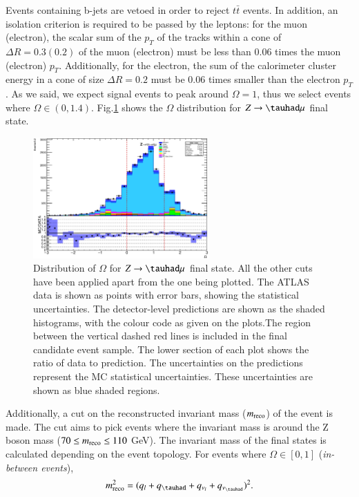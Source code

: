 Events containing b-jets are vetoed in order to reject $t\bar{t}$ events. In addition, an isolation criterion is required to be passed by the leptons: for the muon (electron), the scalar sum of the $p_T$ of the tracks within a cone of $\Delta R=0.3 (0.2)$ of the muon (electron) must be less than 0.06 times the muon (electron) $p_T$. Additionally, for the electron, the sum of the calorimeter cluster energy in a cone of size $\Delta R=0.2$ must be 0.06 times smaller than the electron $p_T$. As we said, we expect signal events to peak around $\Omega=1$, thus we select events where $\Omega\in (0,1.4)$. Fig.\ref{Fig3} shows the $\Omega$ distribution for $Z\to\tauhad\mu$ final state.
\begin{figure}[htbp]
	\centering
	\includegraphics[width=0.6\textwidth]{figures/Fig3.png}
	\caption{Distribution of $\Omega$ for $Z\to\tauhad\mu$ final state. All the other cuts have been applied apart from the one being plotted. The ATLAS data is shown as points with error bars, showing the statistical uncertainties. The detector-level predictions are shown as the shaded histograms, with the colour code as given on the plots.The region between the vertical dashed red lines is included in the final candidate event sample. The lower section of each plot shows the ratio of data to prediction. The uncertainties on the predictions represent the MC statistical uncertainties. These uncertainties are shown as blue shaded regions.}
	\label{Fig3}
\end{figure}
Additionally, a cut on the reconstructed invariant mass ($m_{\text{reco}}$) of the event is made. The cut aims to pick events where the invariant mass is around the Z boson mass ($70\leq m_{\text{reco}}\leq 110$ GeV). The invariant mass of the final states is calculated depending on the event topology. For events where $\Omega\in [0,1]$ (\textit{in-between events}),
\begin{equation}
\mreco^{2}=(q_l+q_{\tauhad}+q_{\nu_l}+q_{\nu_{\tauhad}})^2.
\label{eq35}
\end{equation}
